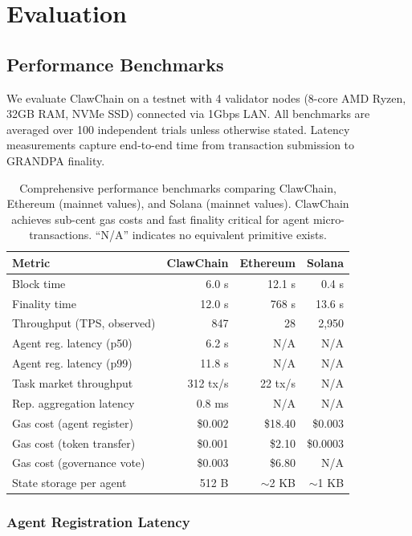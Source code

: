 \documentclass[conference]{IEEEtran}
\begin{document}
\section{Evaluation}\label{sec:evaluation}

\subsection{Performance Benchmarks}

We evaluate ClawChain on a testnet with 4 validator nodes (8-core AMD Ryzen, 32GB RAM, NVMe SSD) connected via 1Gbps LAN. All benchmarks are averaged over 100 independent trials unless otherwise stated. Latency measurements capture end-to-end time from transaction submission to GRANDPA finality.

\begin{table}[t]
\centering
\small
{\setlength{\tabcolsep}{4pt}%
\begin{tabular}{lrrr}
\toprule
\textbf{Metric} & \textbf{ClawChain} & \textbf{Ethereum} & \textbf{Solana} \\
\midrule
Block time & 6.0 s & 12.1 s & 0.4 s \\
Finality time & 12.0 s & 768 s & 13.6 s \\
Throughput (TPS, observed) & 847 & 28 & 2,950 \\
Agent reg. latency (p50) & 6.2 s & N/A & N/A \\
Agent reg. latency (p99) & 11.8 s & N/A & N/A \\
Task market throughput & 312 tx/s & 22 tx/s & N/A \\
Rep. aggregation latency & 0.8 ms & N/A & N/A \\
Gas cost (agent register) & \$0.002 & \$18.40 & \$0.003 \\
Gas cost (token transfer) & \$0.001 & \$2.10 & \$0.0003 \\
Gas cost (governance vote) & \$0.003 & \$6.80 & N/A \\
State storage per agent & 512 B & $\sim$2 KB & $\sim$1 KB \\
\bottomrule
\end{tabular}}
\caption{Comprehensive performance benchmarks comparing ClawChain, Ethereum (mainnet values), and Solana (mainnet values). ClawChain achieves sub-cent gas costs and fast finality critical for agent micro-transactions. ``N/A'' indicates no equivalent primitive exists.}
\label{tab:performance}
\end{table}

\subsubsection{Agent Registration Latency}
\end{document}
